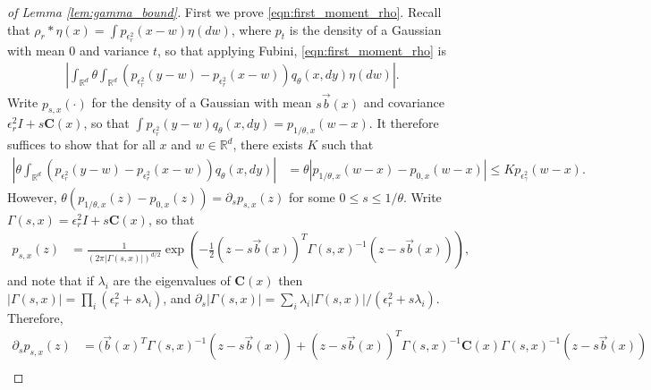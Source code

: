 \documentclass[EJP]{ejpecp} %
\newcommand{\IR}{\mathbb R}
\newcommand{\meanq}{\vec b}    %
\newcommand{\covq}{\mathbf{C}}     %
\newcommand{\kernel}{\rho}  %
\newcommand{\smooth}[1]{\kernel_{#1} \! * \!}  %
\begin{document}
\begin{proof}[of Lemma \ref{lem:gamma_bound}]

    First we prove \eqref{eqn:first_moment_rho}.
    Recall that $\smooth{r} \eta(x) = \int p_{\epsilon^2_r}(x - w) \eta(dw)$,
    where $p_t$ is the density of a Gaussian with mean 0 and variance $t$,
    so that applying Fubini, \eqref{eqn:first_moment_rho} is
    \begin{align*}
        \left|
        \int_{\IR^d}
        \theta
            \int_{\IR^d}
                ( p_{\epsilon_r^2}(y - w) - p_{\epsilon_r^2}(x - w) )
            q_\theta(x, dy)
        \eta(dw)
        \right| .
    \end{align*}
    Write $p_{s, x}(\cdot)$ for the density of a Gaussian
    with mean $s \meanq(x)$ and covariance $\epsilon_r^2 I + s \covq(x)$,
    so that $\int p_{\epsilon_r^2}(y - w) q_\theta(x, dy) = p_{1/\theta, x}(w-x)$.
    It therefore suffices to show that for all $x$ and $w \in \IR^d$,
    there exists $K$ such that
    \begin{align*}
        \left|
        \theta
            \int_{\IR^d}
                ( p_{\epsilon_r^2}(y-w) - p_{\epsilon_r^2}(x-w) )
            q_\theta(x, dy)
        \right|
        &=
        \theta \left|
            p_{1/\theta, x}(w-x) - p_{0, x}(w-x)
        \right|
        \le
        K p_{\epsilon^2_\gamma}(w-x) .
    \end{align*}
    However,
    $\theta( p_{1/\theta, x}(z) - p_{0, x}(z) )
    = \partial_s p_{s, x}(z)$ for some $0 \le s \le 1/\theta$.
    Write $\Gamma(s,x) = \epsilon_r^2 I + s \covq(x)$,
    so that
    \begin{align*}
        p_{s, x}(z)
        &=
        \frac{1}{\left(2 \pi |\Gamma(s,x)|\right)^{d/2}}
        \exp\left(
            -\frac{1}{2} (z - s\meanq(x))^T \Gamma(s,x)^{-1} (z - s\meanq(x))
        \right) ,
    \end{align*}
    and note that if $\lambda_i$ are the eigenvalues of $\covq(x)$
    then $|\Gamma(s, x)| = \prod_i (\epsilon_r^2 + s \lambda_i)$,
    and
    $\partial_s |\Gamma(s, x)| = \sum_i \lambda_i |\Gamma(s, x)| / (\epsilon_r^2 + s \lambda_i)$.
    Therefore,
    \begin{align*}
        \partial_s p_{s, x}(z)
        &=
        \bigg(
            \meanq(x)^T \Gamma(s,x)^{-1} (z - s \meanq(x))
            +
            (z - s \meanq(x))^T
            \Gamma(s,x)^{-1} \covq(x) \Gamma(s,x)^{-1}
            (z - s \meanq(x))
        \\ & \qquad \qquad \qquad {}

\end{align*}
\end{proof}
\end{document}
